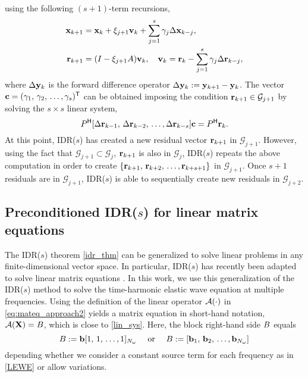 using the following $(s+1)$-term recursions,
\begin{align*}
{\mathbf{x}}_{k+1} &=  {\mathbf{x}}_{k} + {\xi}_{j+1}\mathbf{v}_k +\sum_{j=1}^s \gamma_j \Delta{\mathbf{x}}_{k-j}, \\
\mathbf{r}_{k+1} &=  (I - {\xi}_{j+1}A)\mathbf{v}_k, \quad
\mathbf{v}_{k} =   \mathbf{r}_k - \sum_{j=1}^s \gamma_j \Delta\mathbf{r}_{k-j},
\end{align*}
where $\Delta \mathbf{y}_k$ is the forward difference operator $\Delta \mathbf{y}_k :=
\mathbf{y}_{k+1} - \mathbf{y}_k$.  The vector $\mathbf{c} = (\gamma_1,\, \gamma_2,\,\dots,\gamma_s)^\mathsf{T}$ can be
obtained imposing the condition $\mathbf{r}_{k+1} \in \mathcal{G}_{j+1}$ by solving the
$s\times s$ linear system,
\begin{equation*}
P^{\mathsf{H}} [\Delta \mathbf{r}_{k-1}, \, \Delta \mathbf{r}_{k-2},\,\dots, \Delta
\mathbf{r}_{k-s}]\mathbf{c} = P^{\mathsf{H}}\mathbf{r}_k.
\end{equation*}
At this point, IDR($s$) has created a new residual vector $\mathbf{r}_{k+1}$ in
$\mathcal{G}_{j+1}$. However, using the fact that $\mathcal{G}_{j+1} \subset \mathcal{G}_{j}$, 
$\mathbf{r}_{k+1}$ is also in $\mathcal{G}_{j}$, IDR($s$) repeats the above computation
in order to create $\{\mathbf{r}_{k+1}, \, \mathbf{r}_{k+2},\, \dots,
\mathbf{r}_{k+s+1}\}$ in $\mathcal{G}_{j+1}$. Once $s+1$ residuals are in
$\mathcal{G}_{j+1}$, IDR($s$) is able to sequentially create new residuals in
$\mathcal{G}_{j+2}$.

\subsection{Preconditioned IDR($s$) for linear matrix equations}
\label{ch:idr_me}
The IDR($s$) theorem \ref{idr_thm} can be generalized to solve linear problems in any finite-dimensional vector space. In particular, IDR($s$) has recently been a\-da\-pted to solve linear matrix equations \cite{ag15}. In this work, we use this generalization of the IDR($s$) method to solve the time-harmonic elastic wave equation at multiple frequencies. Using the definition of the linear operator ${\mathcal{A}}(\cdot)$ in \eqref{eq:mateq_approach2} yields a matrix equation in short-hand notation, ${\mathcal{A}}({\mathbf{X}}) = B$, which is close to \eqref{lin_sys}. Here, the block right-hand side $B$ equals
$$B := \mathbf{b}[1,\, 1,\,\dots,1]_{N_{\omega}} \quad \text{ or } \quad B := [\mathbf{b}_1,\, \mathbf{b}_2,\,\hdots,\mathbf{b}_{N_{\omega}}]$$
depending whether we consider a constant source term for each frequency as in \eqref{LEWE} or allow variations.


